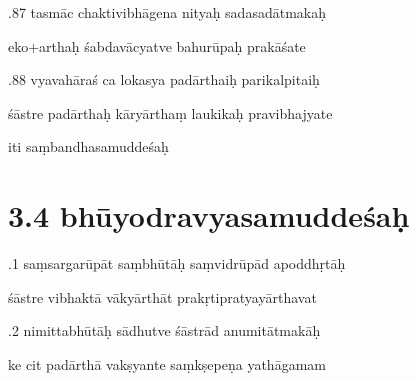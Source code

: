 \documentclass[article,12pt,a4paper]{memoir}%
\newcounter{parCount}
\begin{document}
	  
	  \pstart {}.87 tasmāc chaktivibhāgena nityaḥ sadasadātmakaḥ 
	{}
	\pend%
      

	  
	  \pstart \leavevmode%
	eko+arthaḥ śabdavācyatve bahurūpaḥ prakāśate 
	{}
	\pend%
      

	  
	  \pstart {}.88 vyavahāraś ca lokasya padārthaiḥ parikalpitaiḥ 
	{}
	\pend%
      

	  
	  \pstart \leavevmode%
	śāstre padārthaḥ kāryārthaṃ laukikaḥ pravibhajyate 
	{}
	\pend%
      

	  
	  \pstart \leavevmode%
	iti saṃbandhasamuddeśaḥ
	{}
	\pend%
      
	  
	
\chapter[{3.4 bhūyodravyasamuddeśaḥ}][{3.4 bhūyodravyasamuddeśaḥ}]{ 3.4 bhūyodravyasamuddeśaḥ}

	  
	  \pstart {}.1 saṃsargarūpāt saṃbhūtāḥ saṃvidrūpād apoddhṛtāḥ 
	{}
	\pend%
      

	  
	  \pstart \leavevmode%
	śāstre vibhaktā vākyārthāt prakṛtipratyayārthavat 
	{}
	\pend%
      

	  
	  \pstart {}.2 nimittabhūtāḥ sādhutve śāstrād anumitātmakāḥ 
	{}
	\pend%
      

	  
	  \pstart \leavevmode%
	ke cit padārthā vakṣyante saṃkṣepeṇa yathāgamam 
	{}
	\pend%
      
\end{document}
